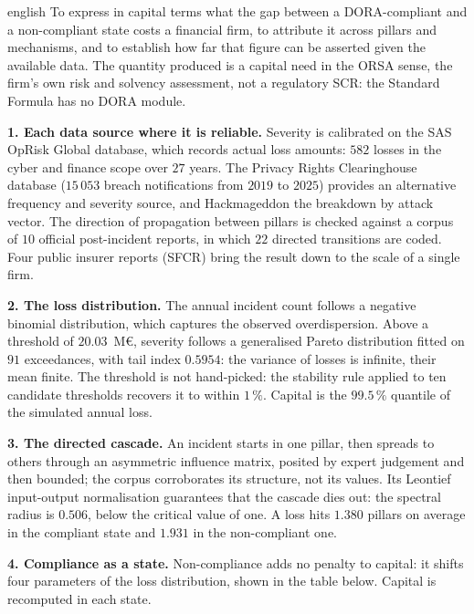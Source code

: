 \begin{otherlanguage*}{english}
To express in capital terms what the gap between a DORA-compliant and a non-compliant state costs a
financial firm, to attribute it across pillars and mechanisms, and to establish how far that figure
can be asserted given the available data. The quantity produced is a capital need in the ORSA
sense, the firm's own risk and solvency assessment, not a regulatory SCR: the Standard Formula has
no DORA module.

\textbf{1. Each data source where it is reliable.} Severity is calibrated on the SAS OpRisk Global
database, which records actual loss amounts: $582$ losses in the cyber and finance scope over
$27$ years. The Privacy Rights Clearinghouse database ($15\,053$ breach notifications from $2019$
to $2025$) provides an alternative frequency and severity source, and Hackmageddon the breakdown by
attack vector. The direction of propagation between pillars is checked against a corpus of $10$
official post-incident reports, in which $22$ directed transitions are coded. Four public insurer
reports (SFCR) bring the result down to the scale of a single firm.

\textbf{2. The loss distribution.} The annual incident count follows a negative binomial
distribution, which captures the observed overdispersion. Above a threshold of $20.03$~M\euro,
severity follows a generalised Pareto distribution fitted on $91$ exceedances, with tail index
$0.5954$: the variance of losses is infinite, their mean finite. The threshold is not hand-picked:
the stability rule applied to ten candidate thresholds recovers it to within $1\,\%$. Capital is
the $99.5\,\%$ quantile of the simulated annual loss.

\textbf{3. The directed cascade.} An incident starts in one pillar, then spreads to others through
an asymmetric influence matrix, posited by expert judgement and then bounded; the corpus
corroborates its structure, not its values. Its
Leontief input-output normalisation guarantees that the cascade dies out: the spectral radius is
$0.506$, below the critical value of one. A loss hits $1.380$ pillars on average in the compliant
state and $1.931$ in the non-compliant one.

\textbf{4. Compliance as a state.} Non-compliance adds no penalty to capital: it shifts four
parameters of the loss distribution, shown in the table below. Capital is recomputed in each state.


\end{otherlanguage*}
